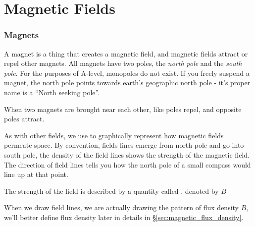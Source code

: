 \chapter{Magnetic Fields}

\subsection{Magnets}

A magnet is a thing that creates a magnetic field, and magnetic fields attract or repel other magnets. All magnets have two poles, the \emph{north pole} and the \emph{south pole}. For the purposes of A-level, monopoles do not exist. If you freely suspend a magnet, the north pole points towards earth's geographic north pole - it's proper name is a ``North seeking pole''.

When two magnets are brought near each other, like poles repel, and opposite poles attract. 

As with other fields, we use  to graphically represent how magnetic fields permeate space. By convention, fields lines emerge from north pole and go into south pole, the density of the field lines shows the strength of the magnetic field. The direction of field lines tells you how the north pole of a small compass would line up at that point.

The strength of the field is described by a quantity called , denoted by $B$

When we draw field lines, we are actually drawing the pattern of flux density $B$, we'll better define flux density later in details in \S\ref{sec:magnetic_flux_density}.


\begin{center}
\end{center}

